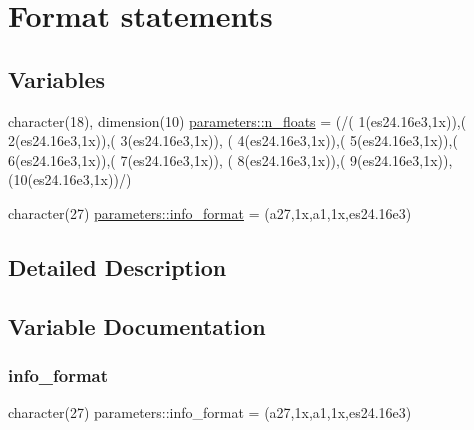\hypertarget{group__FORMATS}{}\section{Format statements}
\label{group__FORMATS}
\subsection*{Variables}
\begin{DoxyCompactItemize}
\item 
character(18), dimension(10) \mbox{\hyperlink{group__FORMATS_ga75e55b6ae9f977f08dcde5798efa2520}{parameters\+::n\+\_\+floats}} = (/\textquotesingle{}( 1(es24.\+16e3,1x))\textquotesingle{},\textquotesingle{}( 2(es24.\+16e3,1x))\textquotesingle{},\textquotesingle{}( 3(es24.\+16e3,1x))\textquotesingle{}, \textquotesingle{}( 4(es24.\+16e3,1x))\textquotesingle{},\textquotesingle{}( 5(es24.\+16e3,1x))\textquotesingle{},\textquotesingle{}( 6(es24.\+16e3,1x))\textquotesingle{},\textquotesingle{}( 7(es24.\+16e3,1x))\textquotesingle{}, \textquotesingle{}( 8(es24.\+16e3,1x))\textquotesingle{},\textquotesingle{}( 9(es24.\+16e3,1x))\textquotesingle{},\textquotesingle{}(10(es24.\+16e3,1x))\textquotesingle{}/)
\item 
character(27) \mbox{\hyperlink{group__FORMATS_ga1d71f88907da2dbb383e489d23cf1346}{parameters\+::info\+\_\+format}} = \textquotesingle{}(a27,1x,a1,1x,es24.\+16e3)\textquotesingle{}
\end{DoxyCompactItemize}


\subsection{Detailed Description}


\subsection{Variable Documentation}
\mbox{\label{group__FORMATS_ga1d71f88907da2dbb383e489d23cf1346}} 
\subsubsection{\texorpdfstring{info\+\_\+format}{info\_format}}
{\footnotesize\ttfamily character(27) parameters\+::info\+\_\+format = \textquotesingle{}(a27,1x,a1,1x,es24.\+16e3)\textquotesingle{}}

